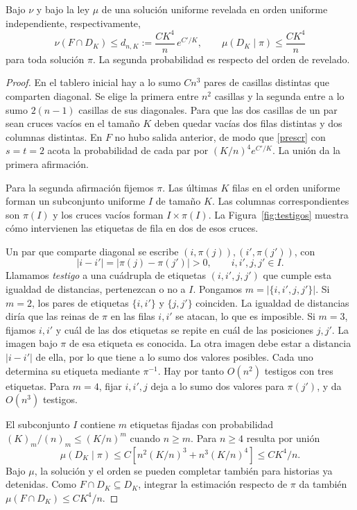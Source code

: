 \begin{lema}\label{terminal-geometria}
Bajo $\nu$ y bajo la ley $\mu$ de una solución uniforme revelada en orden uniforme independiente,
respectivamente,
\[
 \nu(F\cap D_K)\le d_{n,K}:=\frac{C K^4}{n}\,e^{C'/K},
 \qquad \mu(D_K\mid\pi)\le \frac{C K^4}{n}
\]
para toda solución $\pi$. La segunda probabilidad es respecto del orden de
revelado.
\end{lema}
\begin{proof}
En el tablero inicial hay a lo sumo $Cn^3$ pares de casillas distintas que comparten diagonal. Se
elige la primera entre $n^2$ casillas y la segunda entre a lo sumo $2(n-1)$ casillas de sus
diagonales. Para que las dos casillas de un par sean cruces vacíos en el tamaño $K$ deben quedar
vacías dos filas distintas y dos columnas distintas. En $F$ no hubo salida anterior, de modo que
\eqref{prescr} con
$s=t=2$ acota la probabilidad de cada par por $(K/n)^4e^{C'/K}$. La unión da la primera afirmación.

Para la segunda afirmación fijemos $\pi$. Las últimas $K$ filas en el orden uniforme forman un
subconjunto uniforme $I$ de tamaño $K$. Las columnas correspondientes son $\pi(I)$ y los cruces vacíos
forman $I\times\pi(I)$. La Figura~\ref{fig:testigos} muestra cómo intervienen las etiquetas de fila en
dos de esos cruces.


Un par que comparte diagonal se escribe $(i,\pi(j)),(i',\pi(j'))$, con
\[
 |i-i'|=|\pi(j)-\pi(j')|>0,\qquad i,i',j,j'\in I.
\]
Llamamos \emph{testigo} a una cuádrupla de etiquetas $(i,i',j,j')$ que cumple esta igualdad de
distancias, pertenezcan o no a $I$. Pongamos $m=|\{i,i',j,j'\}|$. Si $m=2$, los pares de etiquetas
$\{i,i'\}$ y $\{j,j'\}$ coinciden. La
igualdad de distancias diría que las reinas de $\pi$ en las filas $i,i'$ se atacan, lo que es imposible.
Si $m=3$, fijamos $i,i'$ y cuál de las dos etiquetas se repite en cuál de las posiciones $j,j'$. La
imagen bajo $\pi$ de esa etiqueta es conocida. La otra imagen debe estar a distancia $|i-i'|$ de ella,
por lo que tiene a lo sumo dos valores posibles. Cada uno determina su etiqueta mediante $\pi^{-1}$.
Hay por tanto $O(n^2)$ testigos con tres etiquetas. Para $m=4$, fijar $i,i',j$ deja a lo sumo dos
valores para $\pi(j')$, y da $O(n^3)$ testigos.

El subconjunto $I$ contiene $m$ etiquetas fijadas con probabilidad $(K)_m/(n)_m\le(K/n)^m$ cuando
$n\ge m$. Para $n\ge4$ resulta por unión
\[
 \mu(D_K\mid\pi)\le C\left[n^2(K/n)^3+n^3(K/n)^4\right]\le CK^4/n.
\]
Bajo $\mu$, la solución y el orden se pueden completar también para historias ya detenidas. Como
$F\cap D_K\subseteq D_K$, integrar la estimación respecto de $\pi$ da también $\mu(F\cap D_K)\le
CK^4/n$.
\end{proof}
